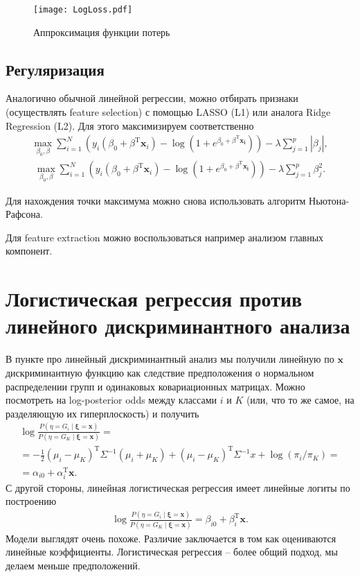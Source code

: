 \documentclass{article}
\begin{document}
\begin{figure}[h]
  \begin{center}
  \texttt{[image: LogLoss.pdf]}
\end{center}
  \caption{Аппроксимация функции потерь}
  \label{fig:LogLoss}
\end{figure}

\subsection{Регуляризация}
Аналогично обычной линейной регрессии, можно отбирать признаки (осуществлять feature selection) с помощью LASSO (L1) или аналога Ridge Regression (L2). Для этого максимизируем соответственно
\begin{align*}
  \max_{\beta_0, \beta} \sum\limits_{i = 1}^N \left( y_i(\beta_0 + \beta^\mathrm{T}\mathbf{x}_i) - \log (1 + e^{\beta_0 + \beta^\mathrm{T}\mathbf{x_i}})\right) - \lambda \sum\limits_{j = 1}^p |\beta_j|,
\end{align*}
\begin{align*}
\max_{\beta_0, \beta} \sum\limits_{i = 1}^N \left( y_i(\beta_0 + \beta^\mathrm{T}\mathbf{x}_i) - \log (1 + e^{\beta_0 + \beta^\mathrm{T}\mathbf{x_i}})\right) - \lambda \sum\limits_{j = 1}^p \beta_j^2.
\end{align*}

Для нахождения точки максимума можно снова использовать алгоритм Ньютона-Рафсона.

Для feature extraction можно воспользоваться например анализом главных компонент.

\section{Логистическая регрессия против линейного дискриминантного анализа}
В пункте про линейный дискриминантный анализ мы получили линейную по $\mathbf{x}$ дискриминантную функцию как следствие предположения о нормальном распределении групп и одинаковых ковариационных матрицах. Можно посмотреть на log-posterior odds между классами $i$ и $K$ (или, что то же самое, на разделяющую их гиперплоскость) и получить
\begin{multline*}
  \log \frac{P(\eta = G_i \mid \boldsymbol{\xi} = \mathbf{x})}{P(\eta = G_K \mid \boldsymbol{\xi} = \mathbf{x})} = \\ = -\frac{1}{2} (\mu_i - \mu_K)^\mathrm{T} \Sigma^{-1}(\mu_i + \mu_K) + (\mu_i - \mu_K)^\mathrm{T} \Sigma^{-1}x + \log(\pi_i/\pi_K) = \\
  = \alpha_{i0} + \alpha_i^\mathrm{T}\mathbf{x}.
\end{multline*}
С другой стороны, линейная логистическая регрессия имеет линейные логиты по построению
\begin{align*}
  \log \frac{P(\eta = G_i \mid \boldsymbol{\xi} = \mathbf{x})}{P(\eta = G_K \mid \boldsymbol{\xi} = \mathbf{x})} = \beta_{i0} + \beta_i^\mathrm{T}\mathbf{x}.
\end{align*}
Модели выглядят очень похоже. Различие заключается в том как оцениваются линейные коэффициенты. Логистическая регрессия -- более общий подход, мы делаем меньше предположений.
\end{document}
